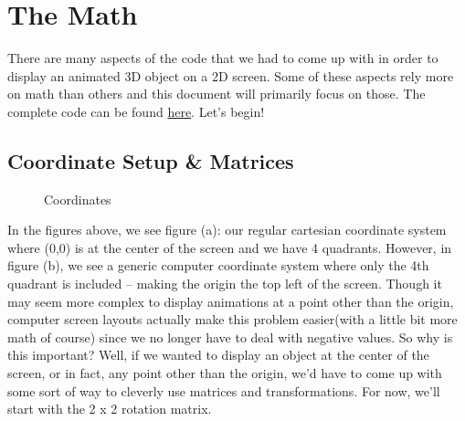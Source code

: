 \documentclass[14pt]{article}
\begin{document}
\newpage

\section*{The Math}

There are many aspects of the code that we had to come up with in order to display an animated 3D object on a 2D screen. Some of these aspects rely more on math than others and this document will primarily focus on those. The complete code can be found \textcolor{blue}{\href{https://github.com/itsmehere/SpinningCube/blob/main/cubeProj.py}{here}}. Let's begin!

\subsection*{Coordinate Setup \& Matrices}

\begin{figure}[!htb]
    \centering
    \qquad
    \caption{Coordinates}%
    \label{fig:example}%
\end{figure}

In the figures above, we see figure (a): our regular cartesian coordinate system where (0,0) is at the center of the screen and we have 4 quadrants. However, in figure (b), we see a generic computer coordinate system where only the 4th quadrant is included -- making the origin the top left of the screen. Though it may seem more complex to display animations at a point other than the origin, computer screen layouts actually make this problem easier(with a little bit more math of course) since we no longer have to deal with negative values. So why is this important? Well, if we wanted to display an object at the center of the screen, or in fact, any point other than the origin, we'd have to come up with some sort of way to cleverly use matrices and transformations. For now, we'll start with the 2 x 2 rotation matrix.
\end{document}
